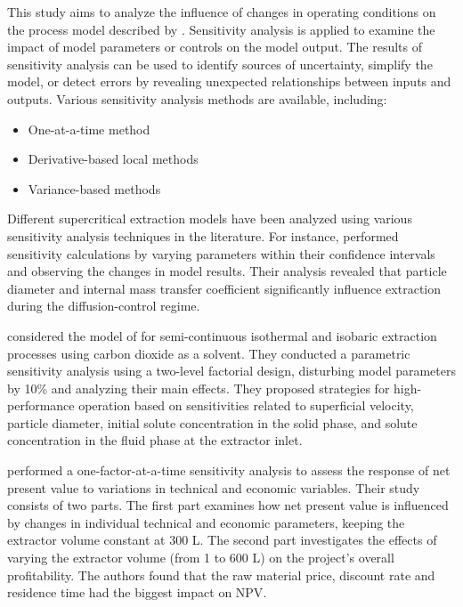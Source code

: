 \documentclass[../Article_Sensitivity_Analsysis.tex]{subfiles}
\begin{document}
	
	
	This study aims to analyze the influence of changes in operating conditions on the process model described by \citet{Sliczniuk2024}. Sensitivity analysis is applied to examine the impact of model parameters or controls on the model output. The results of sensitivity analysis can be used to identify sources of uncertainty, simplify the model, or detect errors by revealing unexpected relationships between inputs and outputs. Various sensitivity analysis methods are available, including:
	
	\begin{itemize}
		\item One-at-a-time method
		\item Derivative-based local methods
		\item Variance-based methods
	\end{itemize}
	
	Different supercritical extraction models have been analyzed using various sensitivity analysis techniques in the literature. For instance, \citet{Fiori_2007} performed sensitivity calculations by varying parameters within their confidence intervals and observing the changes in model results. Their analysis revealed that particle diameter and internal mass transfer coefficient significantly influence extraction during the diffusion-control regime.
	
	\citet{Santos2000} considered the model of \citet{Sovova1994} for semi-continuous isothermal and isobaric extraction processes using carbon dioxide as a solvent. They conducted a parametric sensitivity analysis using a two-level factorial design, disturbing model parameters by 10\% and analyzing their main effects. They proposed strategies for high-performance operation based on sensitivities related to superficial velocity, particle diameter, initial solute concentration in the solid phase, and solute concentration in the fluid phase at the extractor inlet.
	
	\citet{Hatami2024} performed a one-factor-at-a-time sensitivity analysis to assess the response of net present value to variations in technical and economic variables. Their study consists of two parts. The first part examines how net present value is influenced by changes in individual technical and economic parameters, keeping the extractor volume constant at 300 L. The second part investigates the effects of varying the extractor volume (from 1 to 600 L) on the project's overall profitability. {\color{blue}The authors found that the raw material price, discount rate and residence time had the biggest impact on NPV}.
	
	
\end{document}
